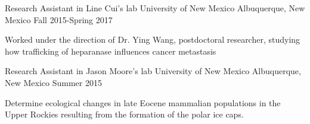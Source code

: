 \begin{cventries}
  \cventry
    {Research Assistant in Line Cui's lab} %
    {University of New Mexico} %
    {Albuquerque, New Mexico} %
    {Fall 2015-Spring 2017} %
    {
      \begin{cvitems}
        \item{
          Worked under the direction of Dr. Ying Wang, postdoctoral researcher, studying how trafficking of heparanase influences cancer metastasis
        }
      \end{cvitems}
    }

  \cventry
    {Research Assistant in Jason Moore's lab} %
    {University of New Mexico} %
    {Albuquerque, New Mexico} %
    {Summer 2015} %
    {
      \begin{cvitems}
        \item{
          Determine ecological changes in late Eocene mammalian populations in the Upper Rockies resulting from the formation of the polar ice caps.
        }
      \end{cvitems}
    }
\end{cventries}
